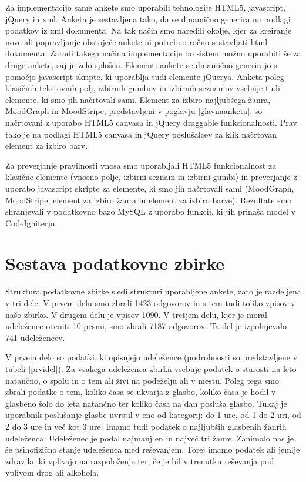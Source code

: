 \documentclass[a4paper, 12pt]{book}
\begin{document}
{Za implementacijo same ankete smo uporabili tehnologije HTML5, javascript, jQuery in xml. Anketa je sestavljena tako, da se dinamično generira na podlagi podatkov iz xml dokumenta. Na tak način smo naredili okolje, kjer za kreiranje nove ali popravljanje obstoječe ankete ni potrebno ročno sestavljati html dokumenta. Zaradi takega načina implementacije bo sistem možno uporabiti še za druge ankete, saj je zelo splošen. Elementi ankete se dinamično generirajo s pomočjo javascript skripte, ki uporablja tudi elemente jQuerya. Anketa poleg klasičnih tekstovnih polj, izbirnih gumbov in izbirnih seznamov vsebuje tudi elemente, ki smo jih načrtovali sami. Element za izbiro najljubšega žanra, MoodGraph in MoodStripe, predstavljeni v poglavju \ref{glavnaanketa}, so načrtovani z uporabo HTML5 canvasa in jQuery draggable funkcionalnosti. Prav tako je na podlagi HTML5 canvasa in jQuery poslušalcev za klik načrtovan element za izbiro barv. 

Za preverjanje pravilnosti vnosa smo uporabljali HTML5 funkcionalnost za klasične elemente (vnosno polje, izbirni seznam in izbirni gumbi) in preverjanje z uporabo javascript skripte za elemente, ki smo jih načrtovali sami (MoodGraph, MoodStripe, element za izbiro žanra in element za izbiro barve). Rezultate smo shranjevali v podatkovno bazo MySQL z uporabo funkcij, ki jih prinaša model v CodeIgniterju. 


\section{Sestava podatkovne zbirke}

Struktura podatkovne zbirke sledi strukturi uporabljene ankete, zato je razdeljena v tri dele.  V prvem delu smo zbrali 1423 odgovorov in s tem tudi toliko vpisov v našo zbirko. V drugem delu je vpisov 1090. V tretjem delu, kjer je moral udeleženec oceniti 10 pesmi, smo zbrali 7187 odgovorov. Ta del je izpolnjevalo 741 udeležencev.

V prvem delo so podatki, ki opisujejo udeležence (podrobnosti so predstavljene v tabeli \ref{prvidel}). Za vsakega udeleženca zbirka vsebuje podatek o starosti na leto natančno, o spolu in o tem ali živi na podeželju ali v mestu. Poleg tega smo zbrali podatke o tem, koliko časa se ukvarja z glasbo, koliko časa je hodil v glasbeno šolo do leta natančno ter koliko časa na dan posluša glasbo. Tukaj je uporabnik poslušanje glasbe uvrstil v eno od kategorij: do 1 ure, od 1 do 2 uri, od 2 do 3 ure in več kot 3 ure. Imamo tudi podatek o najljubših glasbenih žanrih udeleženca. Udeleženec je podal najmanj en in največ tri žanre. Zanimalo nas je še psihofizično stanje udeleženca med reševanjem. Torej imamo podatek ali jemlje zdravila, ki vplivajo na razpoloženje ter, če je bil v trenutku reševanja pod vplivom drog ali alkohola. 

}
\end{document}
